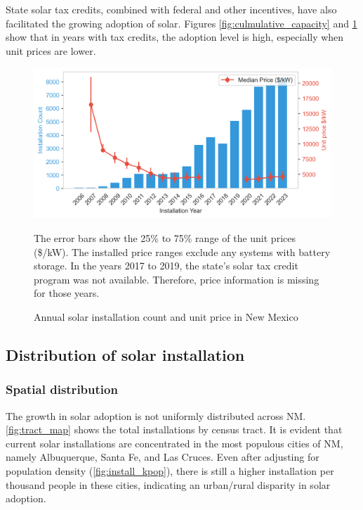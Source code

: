 \documentclass[12pt,twoside,letterpaper]{article}
\begin{document}
State solar tax credits, combined with federal and other incentives, have also facilitated the growing adoption of solar. Figures \ref{fig:culmulative_capacity} and \ref{fig:installation_count} show that in years with tax credits, the adoption level is high, especially when unit prices are lower.

\begin{figure}[H]
    \centering
\includegraphics[width=1\textwidth]{figures/installation_count_price.png}
    \caption{Annual solar installation count and unit price in New Mexico}
    \label{fig:installation_count}
    \begin{flushleft}
        \footnotesize The error bars show the 25\% to 75\% range of the unit prices (\$/kW). The installed price ranges exclude any systems with battery storage. In the years 2017 to 2019, the state’s solar tax credit program was not available. Therefore, price information is missing for those years.
    \end{flushleft}
\end{figure}

\subsection{Distribution of solar installation}

\subsubsection{Spatial distribution}

The growth in solar adoption is not uniformly distributed across NM. \autoref{fig:tract_map} shows the total installations by census tract. It is evident that current solar installations are concentrated in the most populous cities of NM, namely Albuquerque, Santa Fe, and Las Cruces. Even after adjusting for population density (\autoref{fig:install_kpop}), there is still a higher installation per thousand people in these cities, indicating an urban/rural disparity in solar adoption.
\end{document}
